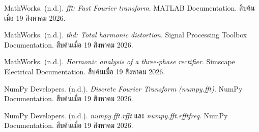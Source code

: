 \begin{raggedright}
MathWorks. (n.d.). \textit{fft: Fast Fourier transform}. MATLAB Documentation. สืบค้นเมื่อ 19 สิงหาคม 2026.

MathWorks. (n.d.). \textit{thd: Total harmonic distortion}. Signal Processing Toolbox Documentation. สืบค้นเมื่อ 19 สิงหาคม 2026.

MathWorks. (n.d.). \textit{Harmonic analysis of a three-phase rectifier}. Simscape Electrical Documentation. สืบค้นเมื่อ 19 สิงหาคม 2026.

NumPy Developers. (n.d.). \textit{Discrete Fourier Transform (numpy.fft)}. NumPy Documentation. สืบค้นเมื่อ 19 สิงหาคม 2026.

NumPy Developers. (n.d.). \textit{numpy.fft.rfft} และ \textit{numpy.fft.rfftfreq}. NumPy Documentation. สืบค้นเมื่อ 19 สิงหาคม 2026.

\end{raggedright}

